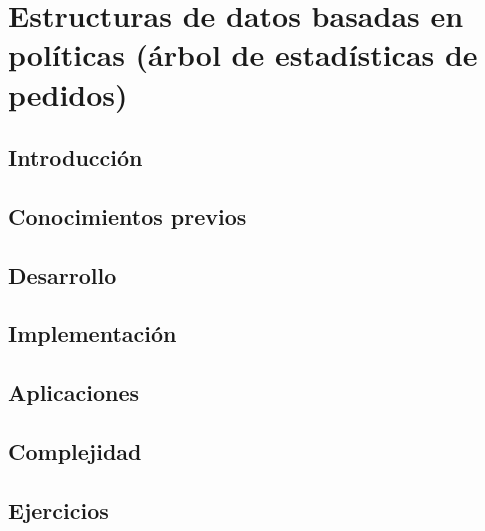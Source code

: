 \chapter{Estructuras de datos basadas en políticas (árbol de estadísticas de pedidos)}
\section{Introducción}

\section{Conocimientos previos}

\section{Desarrollo}

\section{Implementación}

\section{Aplicaciones}

\section{Complejidad}

\section{Ejercicios}
